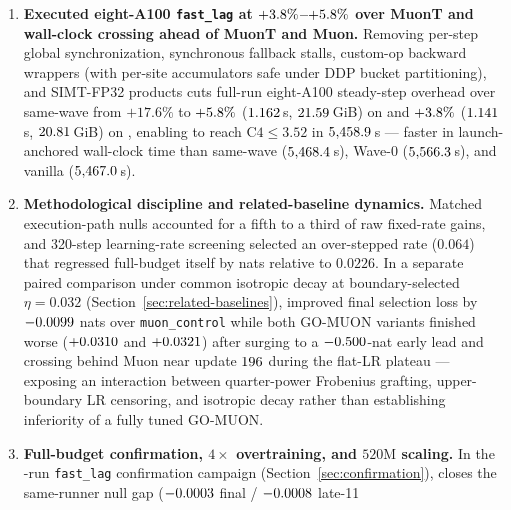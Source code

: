 \begin{enumerate}
  decay, and execution together (Section~\ref{sec:sym-root-fidelity}).
\item \textbf{Executed eight-A100 \texttt{fast\_lag} at
  $+3.8\%$--$+5.8\%$ over MuonT and
  wall-clock crossing ahead of MuonT and Muon.}
  Removing per-step global synchronization, synchronous fallback stalls,
  custom-op backward wrappers (with per-site accumulators safe under DDP bucket
  partitioning), and SIMT-FP32 products cuts full-run eight-A100 steady-step
  overhead over same-wave  from $+17.6\%$ to
  $+5.8\%$ ($1.162$\,s,
  $21.59$\,GiB) on  and
  $+3.8\%$ ($1.141$\,s,
  $20.81$\,GiB) on , enabling  to
  reach $\text{C4}\le 3.52$ in $5{,}458.9$\,s --- faster in
  launch-anchored wall-clock time than same-wave 
  ($5{,}468.4$\,s), Wave-0 
  ($5{,}566.3$\,s), and vanilla 
  ($5{,}467.0$\,s).
\item \textbf{Methodological discipline and related-baseline dynamics.}
  Matched execution-path nulls accounted for a fifth to a third of raw
  fixed-rate gains, and 320-step learning-rate screening selected an
  over-stepped rate ($0.064$) that regressed full-budget \muont{} itself by
  \waveTwelveMuontSelDiffMag{} nats relative to $0.0226$. In a separate paired
  comparison under common isotropic decay at boundary-selected $\eta = 0.032$
  (Section~\ref{sec:related-baselines}),  improved final
  selection loss by $-0.0099{}$ nats over \texttt{muon\_control}
  while both GO-MUON variants finished worse ($+0.0310{}$
  and $+0.0321{}$) after surging to a
  $-0.500{}$-nat early lead and crossing behind Muon near update
  $196{}$ during the flat-LR plateau --- exposing an
  interaction between quarter-power Frobenius grafting, upper-boundary LR
  censoring, and isotropic decay rather than establishing inferiority of a
  fully tuned GO-MUON.
\item \textbf{Full-budget confirmation, $4\times$ overtraining, and $520\text{M}$
  scaling.}
  In the \confTotalRuns{}-run \texttt{fast\_lag} confirmation campaign
  (Section~\ref{sec:confirmation}),  closes the same-runner null
  gap ($-0.0003{}$ final / $-0.0008{}$ late-11

\end{enumerate}
